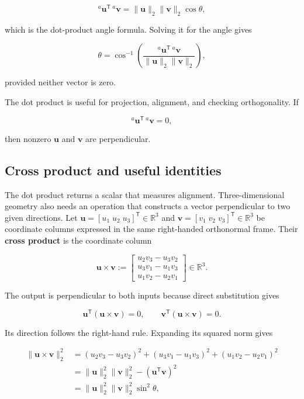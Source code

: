 \documentclass[
  australian,
  12pt,
  letterpaper,
  DIV=11,
  numbers=noendperiod,
  twoside]{scrreprt}
\begin{document}
\[
{}^{a}\mathbf{u}^\mathsf{T}\,{}^{a}\mathbf{v}
=
\|\mathbf{u}\|_2\|\mathbf{v}\|_2\cos\theta,
\]

which is the dot-product angle formula. Solving it for the angle gives

\[
\theta
=
\cos^{-1}
\left(
\frac{{}^{a}\mathbf{u}^\mathsf{T}\,{}^{a}\mathbf{v}}
{\|\mathbf{u}\|_2\|\mathbf{v}\|_2}
\right),
\]

provided neither vector is zero.

The dot product is useful for projection, alignment, and checking
orthogonality. If

\[
{}^{a}\mathbf{u}^\mathsf{T}\,{}^{a}\mathbf{v}=0,
\]

then nonzero \(\mathbf{u}\) and \(\mathbf{v}\) are perpendicular.

\subsection{Cross product and useful
identities}\label{sec-linear-algebra-cross-product}

The dot product returns a scalar that measures alignment.
Three-dimensional geometry also needs an operation that constructs a
vector perpendicular to two given directions. Let
\(\mathbf u=[u_1\;u_2\;u_3]^\mathsf T\in\mathbb R^3\) and
\(\mathbf v=[v_1\;v_2\;v_3]^\mathsf T\in\mathbb R^3\) be coordinate
columns expressed in the same right-handed orthonormal frame. Their
\textbf{cross product} is the coordinate column

\[
\boxed{
\mathbf u\times\mathbf v
\mathrel{:=}
\begin{bmatrix}
u_2v_3-u_3v_2\\
u_3v_1-u_1v_3\\
u_1v_2-u_2v_1
\end{bmatrix}
\in\mathbb R^3
}.
\]

The output is perpendicular to both inputs because direct substitution
gives

\[
\mathbf u^\mathsf T(\mathbf u\times\mathbf v)
=
0,
\qquad
\mathbf v^\mathsf T(\mathbf u\times\mathbf v)
=
0.
\]

Its direction follows the right-hand rule. Expanding its squared norm
gives

\[
\begin{aligned}
\|\mathbf u\times\mathbf v\|_2^2
&=
(u_2v_3-u_3v_2)^2
+
(u_3v_1-u_1v_3)^2
+
(u_1v_2-u_2v_1)^2\\
&=
\|\mathbf u\|_2^2\|\mathbf v\|_2^2
-
(\mathbf u^\mathsf T\mathbf v)^2\\
&=
\|\mathbf u\|_2^2\|\mathbf v\|_2^2\sin^2\theta,
\end{aligned}
\]
\end{document}
